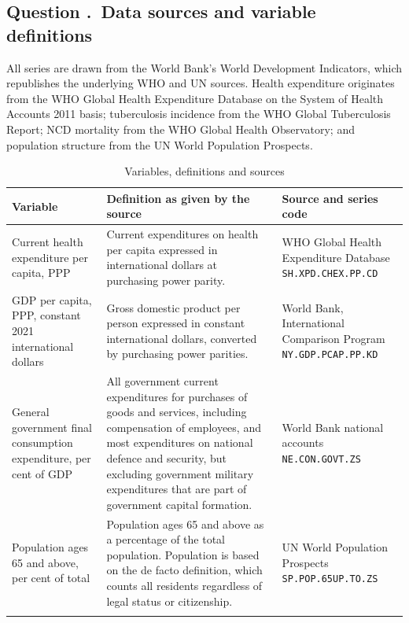 \documentclass[11pt,a4paper]{article}
\newcounter{qnum}
\newcommand{\question}[1]{\subsection*{Question \stepcounter{qnum}\theqnum.\ #1}}
\begin{document}
\question{Data sources and variable definitions}

All series are drawn from the World Bank's World Development Indicators, which
republishes the underlying WHO and UN sources. Health expenditure originates from
the WHO Global Health Expenditure Database on the System of Health Accounts 2011
basis; tuberculosis incidence from the WHO Global Tuberculosis Report; NCD
mortality from the WHO Global Health Observatory; and population structure from
the UN World Population Prospects.

\begin{table}[H]
\centering
\footnotesize
\caption{Variables, definitions and sources}
\label{tab:variables}
\begin{tabularx}{\textwidth}{@{}>{\raggedright\arraybackslash}p{} >{\raggedright\arraybackslash}X >{\raggedright\arraybackslash}p{}@{}}
\toprule
Variable & Definition as given by the source & Source and series code \\
\midrule

Current health expenditure per capita, PPP
& Current expenditures on health per capita expressed in international dollars at
  purchasing power parity.
& WHO Global Health Expenditure Database \newline \texttt{SH.XPD.CHEX.PP.CD} \\
\addlinespace

GDP per capita, PPP, constant 2021 international dollars
& Gross domestic product per person expressed in constant international dollars,
  converted by purchasing power parities.
& World Bank, International Comparison Program \newline
  \texttt{NY.GDP.PCAP.PP.KD} \\
\addlinespace

General government final consumption expenditure, per cent of GDP
& All government current expenditures for purchases of goods and services,
  including compensation of employees, and most expenditures on national defence
  and security, but excluding government military expenditures that are part of
  government capital formation.
& World Bank national accounts \newline \texttt{NE.CON.GOVT.ZS} \\
\addlinespace

Population ages 65 and above, per cent of total
& Population ages 65 and above as a percentage of the total population.
  Population is based on the de facto definition, which counts all residents
  regardless of legal status or citizenship.
& UN World Population Prospects \newline \texttt{SP.POP.65UP.TO.ZS} \\
\addlinespace


\end{tabularx}
\end{table}
\end{document}
